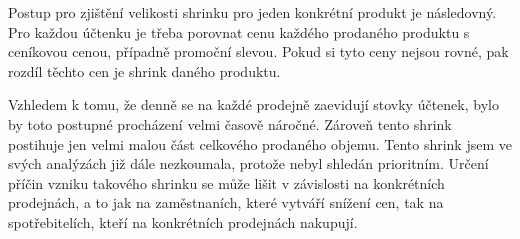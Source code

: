 Postup pro zjištění velikosti shrinku pro jeden konkrétní produkt je následovný. Pro každou účtenku je třeba porovnat cenu každého prodaného produktu s ceníkovou cenou, případně promoční slevou. Pokud si tyto ceny nejsou rovné, pak rozdíl těchto cen je shrink daného produktu.

Vzhledem k tomu, že denně se na každé prodejně zaevidují stovky účtenek, bylo by toto postupné procházení velmi časově náročné. Zároveň tento shrink postihuje jen velmi malou část celkového prodaného objemu. Tento shrink jsem ve svých analýzách již dále nezkoumala, protože nebyl shledán prioritním. Určení příčin vzniku takového shrinku se může lišit v závislosti na konkrétních prodejnách, a to jak na zaměstnaních, které vytváří snížení cen, tak na spotřebitelích, kteří na konkrétních prodejnách nakupují.